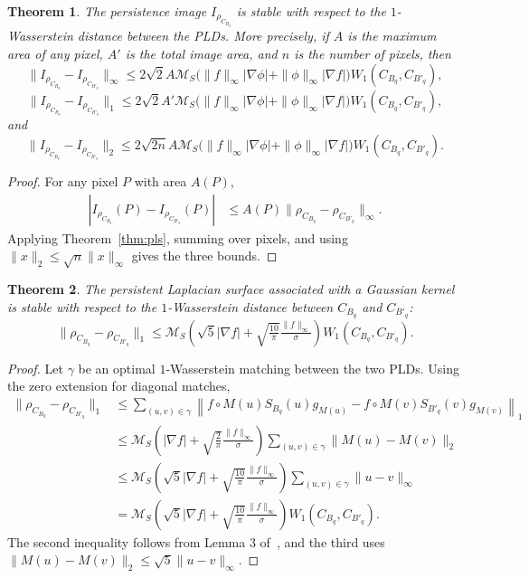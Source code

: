 \documentclass{article}
\newtheorem{theorem}{Theorem}[section]
\begin{document}
\begin{theorem}\label{thm:pls2}
The persistence image $I_{\rho_{C_{B_q}}}$ is stable with respect to the $1$-Wasserstein distance between the PLDs. More precisely, if $A$ is the maximum area of any pixel, $A'$ is the total image area, and $n$ is the number of pixels, then
\[
\|I_{\rho_{C_{B_q}}}-I_{\rho_{C_{B'_q}}}\|_\infty
\leq 2\sqrt{2}A\mathcal M_S\big(\|f\|_{\infty}|\nabla\phi|+\|\phi\|_{\infty}|\nabla f|\big)W_1(C_{B_q},C_{B'_q}),
\]
\[
\|I_{\rho_{C_{B_q}}}-I_{\rho_{C_{B'_q}}}\|_1
\leq 2\sqrt{2}A'\mathcal M_S\big(\|f\|_{\infty}|\nabla\phi|+\|\phi\|_{\infty}|\nabla f|\big)W_1(C_{B_q},C_{B'_q}),
\]
and
\[
\|I_{\rho_{C_{B_q}}}-I_{\rho_{C_{B'_q}}}\|_2
\leq 2\sqrt{2n}A\mathcal M_S\big(\|f\|_{\infty}|\nabla\phi|+\|\phi\|_{\infty}|\nabla f|\big)W_1(C_{B_q},C_{B'_q}).
\]
\end{theorem}

\begin{proof}
For any pixel $P$ with area $A(P)$,
    \begin{align*}
\left|I_{\rho_{C_{B_q}}}(P)-I_{\rho_{C_{B'_q}}}(P)\right|
&\leq A(P)\|\rho_{C_{B_q}}-\rho_{C_{B'_q}}\|_\infty.
    \end{align*}
Applying Theorem~\ref{thm:pls}, summing over pixels, and using
$\|x\|_2\leq\sqrt n\|x\|_\infty$ gives the three bounds.
\end{proof}

\begin{theorem}\label{thm:GaussSurface}
The persistent Laplacian surface associated with a Gaussian kernel is stable with respect to the $1$-Wasserstein distance between $C_{B_q}$ and $C_{B'_q}$:
\[
\|\rho_{C_{B_q}}-\rho_{C_{B'_q}}\|_1
\leq \mathcal M_S
\left(\sqrt{5}|\nabla f|+\sqrt{\tfrac{10}{\pi}}\tfrac{\|f\|_\infty}{\sigma}\right)
W_1(C_{B_q},C_{B'_q}).
\]
\end{theorem}

\begin{proof}
Let $\gamma$ be an optimal $1$-Wasserstein matching between the two PLDs. Using the zero extension for diagonal matches,
    \begin{align*}
\|\rho_{C_{B_q}}-\rho_{C_{B'_q}}\|_1
&\leq \sum_{(u,v)\in\gamma}
\left\|f\circ M(u)S_{B_q}(u)g_{M(u)}
-f\circ M(v)S_{B'_q}(v)g_{M(v)}\right\|_1\\
&\leq \mathcal M_S
\left(|\nabla f|+\sqrt{\tfrac{2}{\pi}}\tfrac{\|f\|_\infty}{\sigma}\right)
\sum_{(u,v)\in\gamma}\|M(u)-M(v)\|_2\\
&\leq \mathcal M_S
\left(\sqrt{5}|\nabla f|+\sqrt{\tfrac{10}{\pi}}\tfrac{\|f\|_\infty}{\sigma}\right)
\sum_{(u,v)\in\gamma}\|u-v\|_\infty\\
&=\mathcal M_S
\left(\sqrt{5}|\nabla f|+\sqrt{\tfrac{10}{\pi}}\tfrac{\|f\|_\infty}{\sigma}\right)
W_1(C_{B_q},C_{B'_q}).
    \end{align*}
The second inequality follows from Lemma 3 of~\cite{PI17}, and the third uses
$\|M(u)-M(v)\|_2\leq\sqrt5\|u-v\|_\infty$.
\end{proof}
\end{document}
